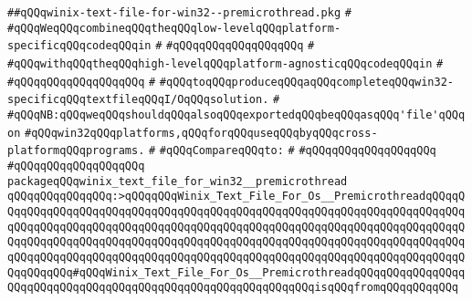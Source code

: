 \label{src/lib/std/src/win32/winix-text-file-for-win32--premicrothread.pkg}
\verb|##qQQqwinix-text-file-for-win32--premicrothread.pkg|\newline
\verb|#|\newline
\verb|#qQQqWeqQQqcombineqQQqtheqQQqlow-levelqQQqplatform-specificqQQqcodeqQQqin|\newline
\verb|#|\newline
\verb|#qQQqqQQqqQQqqQQqqQQq|\newline
\verb|#|\newline
\verb|#qQQqwithqQQqtheqQQqhigh-levelqQQqplatform-agnosticqQQqcodeqQQqin|\newline
\verb|#|\newline
\verb|#qQQqqQQqqQQqqQQqqQQq|\newline
\verb|#|\newline
\verb|#qQQqtoqQQqproduceqQQqaqQQqcompleteqQQqwin32-specificqQQqtextfileqQQqI/OqQQqsolution.|\newline
\verb|#|\newline
\verb|#qQQqNB:qQQqweqQQqshouldqQQqalsoqQQqexportedqQQqbeqQQqasqQQq'file'qQQqon|\newline
\verb|#qQQqwin32qQQqplatforms,qQQqforqQQquseqQQqbyqQQqcross-platformqQQqprograms.|\newline
\verb|#|\newline
\verb|#qQQqCompareqQQqto:|\newline
\verb|#|\newline
\verb|#qQQqqQQqqQQqqQQqqQQq|\newline
\verb|#qQQqqQQqqQQqqQQqqQQq|\newline
\newline
\verb|packageqQQqwinix_text_file_for_win32__premicrothread|\newline
\newline
\verb|qQQqqQQqqQQqqQQq:>qQQqqQQqWinix_Text_File_For_Os__PremicrothreadqQQqqQQqqQQqqQQqqQQqqQQqqQQqqQQqqQQqqQQqqQQqqQQqqQQqqQQqqQQqqQQqqQQqqQQqqQQqqQQqqQQqqQQqqQQqqQQqqQQqqQQqqQQqqQQqqQQqqQQqqQQqqQQqqQQqqQQqqQQqqQQqqQQqqQQqqQQqqQQqqQQqqQQqqQQqqQQqqQQqqQQqqQQqqQQqqQQqqQQqqQQqqQQqqQQqqQQqqQQqqQQqqQQqqQQqqQQqqQQqqQQqqQQqqQQqqQQqqQQqqQQqqQQqqQQqqQQqqQQqqQQqqQQqqQQqqQQq#qQQqWinix_Text_File_For_Os__PremicrothreadqQQqqQQqqQQqqQQqqQQqqQQqqQQqqQQqqQQqqQQqqQQqqQQqqQQqqQQqqQQqqQQqisqQQqfromqQQqqQQqqQQq|\newline
